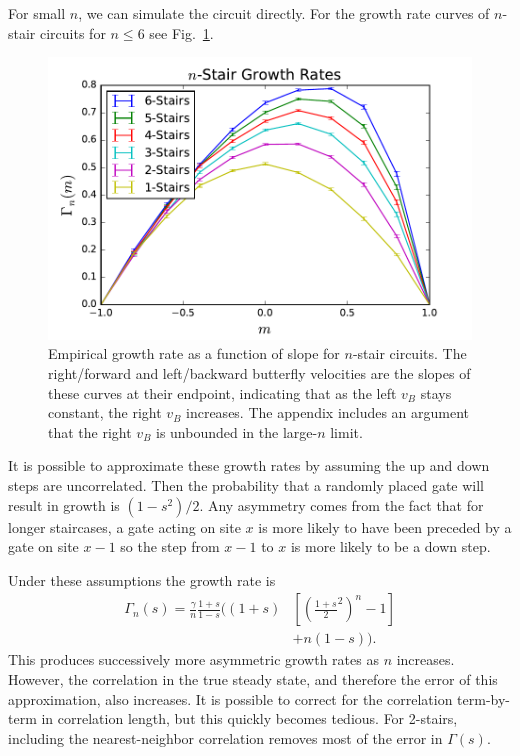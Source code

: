 \documentclass[aps,prx,reprint,superscriptaddress, longbibliography]{revtex4-1}
\begin{document}
For small $n$, we can simulate the circuit directly. For the growth rate curves of $n$-stair circuits for $n\le 6$ see Fig.~\ref{fig:compareRates}. 
\begin{figure}
	\includegraphics[width=\columnwidth]{compareRates.pdf}
	\caption{Empirical growth rate as a function of slope for $n$-stair circuits. The right/forward and left/backward butterfly velocities are the slopes of these curves at their endpoint, indicating that as the left $v_B$ stays constant, the right $v_B$ increases. The appendix includes an argument that the right $v_B$ is unbounded in the large-$n$ limit.}
	\label{fig:compareRates}
\end{figure}	
It is possible to approximate these growth rates by assuming the up and down steps are uncorrelated. Then the probability that a randomly placed gate will result in growth is $(1-s^2)/2$. Any asymmetry comes from the fact that for longer staircases, a gate acting on site $x$ is more likely to have been preceded by a gate on site $x-1$ so the step from $x-1$ to $x$ is more likely to be a down step.

Under these assumptions the growth rate is
\begin{align}
\Gamma_n(s) = \frac{\gamma}{n}\frac{1+s}{1-s}\bigg(
	(1+s)&\left[\left(\frac{1+s}{2}^2\right)^n-1\right]\nonumber \\
	&+n(1-s)\bigg). \label{eqn:growthrate}
\end{align}
This produces successively more asymmetric growth rates as $n$ increases. However, the correlation in the true steady state, and therefore the error of this approximation, also increases. It is possible to correct for the correlation term-by-term in correlation length, but this quickly becomes tedious. For 2-stairs, including the nearest-neighbor correlation removes most of the error in $\Gamma(s)$.
\end{document}
